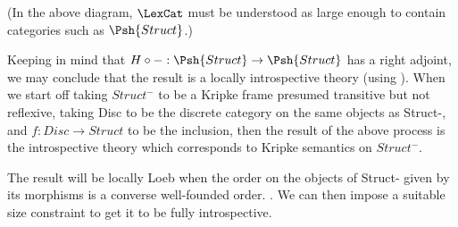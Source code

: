 (In the above diagram, $\LexCat$ must be understood as large enough to contain categories such as $\Psh{Struct}$.)

Keeping in mind that $H \circ - : \Psh{Struct} \to \Psh{Struct}$ has a right adjoint, we may conclude that the result is a locally introspective theory (using ). When we start off taking $Struct^-$ to be a Kripke frame presumed transitive but not reflexive, taking Disc to be the discrete category on the same objects as Struct-, and $f : Disc \to Struct$ to be the inclusion, then the result of the above process is the introspective theory which corresponds to Kripke semantics on $Struct^-$. 

The result will be locally Loeb when the order on the objects of Struct- given by its morphisms is a converse well-founded order. . We can then impose a suitable size constraint to get it to be fully introspective.

